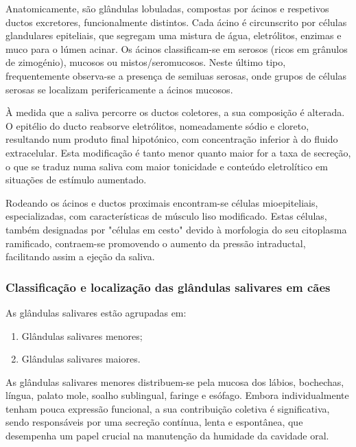 Anatomicamente, são glândulas lobuladas, compostas por ácinos e respetivos ductos excretores, funcionalmente distintos. Cada ácino é circunscrito por células glandulares epiteliais, que segregam uma mistura de água, eletrólitos, enzimas e muco para o lúmen acinar. \cite{Proctor2007,cunningham} Os ácinos classificam-se em serosos (ricos em grânulos de zimogénio), mucosos ou mistos/seromucosos.\cite{cunningham} Neste último tipo, frequentemente observa-se a presença de semiluas serosas, onde grupos de células serosas se localizam perifericamente a ácinos mucosos.\cite{Das_Textbook,cunningham} 

À medida que a saliva percorre os ductos coletores, a sua composição é alterada. \cite{Proctor2007,cunningham} O epitélio do ducto reabsorve eletrólitos, nomeadamente sódio e cloreto, resultando num produto final hipotónico, com concentração inferior à do fluido extracelular. Esta modificação é tanto menor quanto maior for a taxa de secreção, o que se traduz numa saliva com maior tonicidade e conteúdo eletrolítico em situações de estímulo aumentado. \cite{cunningham} 

Rodeando os ácinos e ductos proximais encontram-se células mioepiteliais, especializadas, com características de músculo liso modificado.\cite{cunningham} Estas células, também designadas por "células em cesto" devido à morfologia do seu citoplasma ramificado, contraem-se promovendo o aumento da pressão intraductal, facilitando assim a ejeção da saliva. \cite{Das_Textbook,cunningham}

\subsubsection{Classificação e localização das glândulas salivares em cães}

As glândulas salivares estão agrupadas em:
\begin{enumerate}
    \item	Glândulas salivares menores;
    \item Glândulas salivares maiores.
\end{enumerate}

As glândulas salivares menores distribuem-se pela mucosa dos lábios, bochechas, língua, palato mole, soalho sublingual, faringe e esófago. \cite{Singh2017} Embora individualmente tenham pouca expressão funcional, a sua contribuição coletiva é significativa,\cite{Singh2017} sendo responsáveis por uma secreção contínua, lenta e espontânea, que desempenha um papel crucial na manutenção da humidade da cavidade oral. \cite{Cappai2021}


